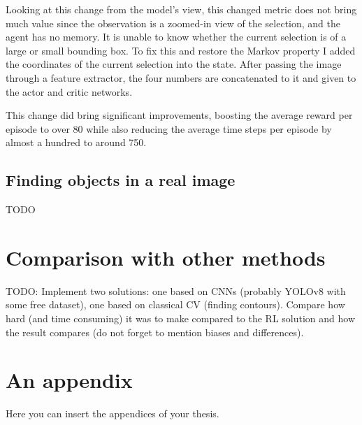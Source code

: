 \documentclass[
  digital,     %
  oneside,     %
  nosansbold,  %
  nocolorbold, %
  lof,         %
  lot,         %
]{fithesis4}
\begin{document}
Looking at this change from the model's view, this changed metric does not bring much value since the observation is a zoomed-in view of the selection, and the agent has no memory. It is unable to know whether the current selection is of a large or small bounding box. To fix this and restore the Markov property I added the coordinates of the current selection into the state. After passing the image through a feature extractor, the four numbers are concatenated to it and given to the actor and critic networks.

This change did bring significant improvements, boosting the average reward per episode to over 80 while also reducing the average time steps per episode by almost a hundred to around 750.

\section{Finding objects in a real image}
TODO

\chapter{Comparison with other methods}
TODO: Implement two solutions: one based on CNNs (probably YOLOv8 with some free dataset), one based on classical CV (finding contours).
%
Compare how hard (and time consuming) it was to make compared to the RL solution and how the result compares (do not forget to mention biases and differences).


\printbibliography[heading=bibintoc] %


\appendix %
\chapter{An appendix}
Here you can insert the appendices of your thesis.
\end{document}
